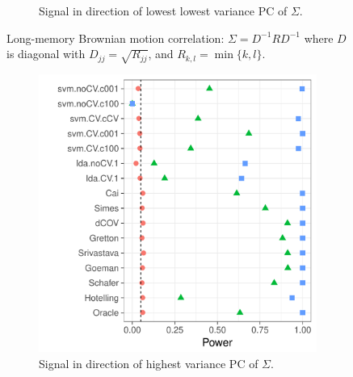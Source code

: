 \documentclass[]{bio}
\begin{document}
\begin{figure}[h]
\begin{subfigure}[t]{.45\columnwidth}
		\caption{Signal in direction of lowest lowest variance PC of $\Sigma$.} 
		\label{fig:dependence_22}
	\end{subfigure}
	\caption{Long-memory Brownian motion correlation: $\Sigma=D^{-1} R D^{-1}$ where $D$ is diagonal with $D_{jj}=\sqrt{R_{jj}}$, and $R_{k,l}=\min\{k,l\}$.}	
	\label{fig:dependence_2}
\end{figure}



\begin{figure}[h]
	\centering
	\begin{subfigure}[t]{.45\columnwidth}
		\centering
		\includegraphics[width=1\columnwidth]{"art/file18"}
		\caption{Signal in direction of highest variance PC of $\Sigma$.} 
		\label{fig:dependence_31}
	\end{subfigure}
	\begin{subfigure}[t]{.45\columnwidth}
		\centering

\end{subfigure}
\end{figure}
\end{document}
